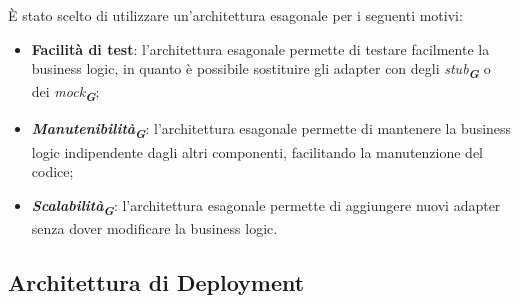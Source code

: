È stato scelto di utilizzare un'architettura esagonale per i seguenti motivi:
\begin{itemize}
    \item \textbf{Facilità di test}: l'architettura esagonale permette di testare facilmente la business logic, in quanto è possibile sostituire gli adapter con degli \emph{stub}\textsubscript{\textbf{\textit{G}}} o dei \emph{mock}\textsubscript{\textbf{\textit{G}}};
    \item \textbf{\emph{Manutenibilità}}\textsubscript{\textbf{\textit{G}}}: l'architettura esagonale permette di mantenere la business logic indipendente dagli altri componenti, facilitando la manutenzione del codice;
    \item \textbf{\emph{Scalabilità}}\textsubscript{\textbf{\textit{G}}}: l'architettura esagonale permette di aggiungere nuovi adapter senza dover modificare la business logic.
\end{itemize}


\subsection{Architettura di Deployment}


